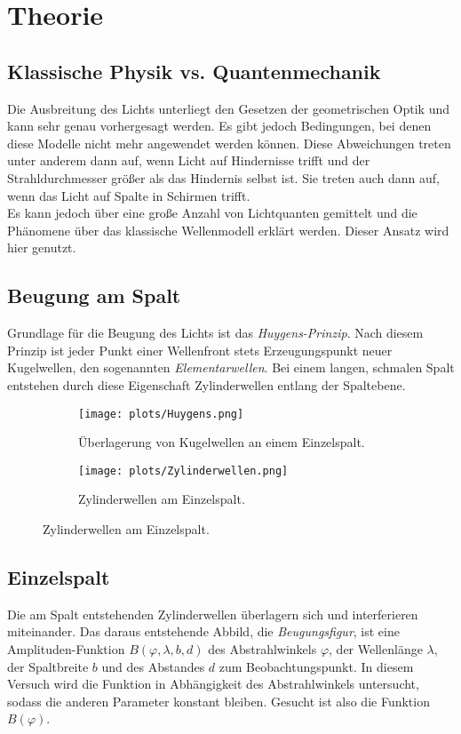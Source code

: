 \section{Theorie}
\label{sec:Theorie}

\subsection{Klassische Physik vs. Quantenmechanik}
Die Ausbreitung des Lichts unterliegt den Gesetzen der geometrischen Optik und kann sehr genau vorhergesagt werden.
Es gibt jedoch Bedingungen, bei denen diese Modelle nicht mehr angewendet werden können.
Diese Abweichungen treten unter anderem dann auf, wenn Licht auf Hindernisse trifft und der Strahldurchmesser größer als das Hindernis selbst ist.
Sie treten auch dann auf, wenn das Licht auf Spalte in Schirmen trifft.\\
Es kann jedoch über eine große Anzahl von Lichtquanten gemittelt und die Phänomene über das klassische Wellenmodell erklärt werden.
Dieser Ansatz wird hier genutzt.\\

\subsection{Beugung am Spalt}
Grundlage für die Beugung des Lichts ist das \textit{Huygens-Prinzip}.
Nach diesem Prinzip ist jeder Punkt einer Wellenfront stets Erzeugungspunkt neuer Kugelwellen, den sogenannten \textit{Elementarwellen}.
Bei einem langen, schmalen Spalt entstehen durch diese Eigenschaft Zylinderwellen entlang der Spaltebene.


\begin{figure}
    \centering
    \begin{subfigure}{.5\textwidth}
      \centering
      \texttt{[image: plots/Huygens.png]}
    \caption{Überlagerung von Kugelwellen an einem Einzelspalt.\cite{HuygensWiki}}
    \label{fig:huygens}
    \end{subfigure}%
    \begin{subfigure}{.5\textwidth}
      \centering
      \texttt{[image: plots/Zylinderwellen.png]}
      \caption{Zylinderwellen am Einzelspalt.\cite{BeugungWiki}}
      \label{fig:zylinder}
    \end{subfigure}
    \label{fig:huygenZylinder}
\end{figure}

\subsection{Einzelspalt}
Die am Spalt entstehenden Zylinderwellen überlagern sich und interferieren miteinander. Das daraus entstehende Abbild, die \textit{Beugungsfigur}, ist eine Amplituden-Funktion $B(\varphi, \lambda, b, d)$ des Abstrahlwinkels $\varphi$,
der Wellenlänge $\lambda$, der Spaltbreite $b$ und des Abstandes $d$ zum Beobachtungspunkt.
In diesem Versuch wird die Funktion in Abhängigkeit des Abstrahlwinkels untersucht, sodass die anderen Parameter konstant bleiben.
Gesucht ist also die Funktion $B(\varphi)$.

